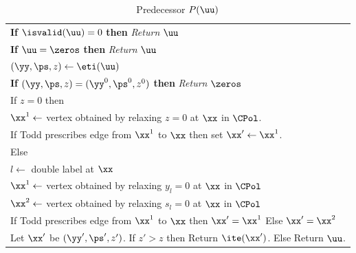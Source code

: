 \begin{table}[!htb]
\caption{Predecessor $P(\uu)$}\label{tab:P}
\begin{tabular}{|l|}
\hline
\hspace{5pt} {\bf If} $\isvalid(\uu)=0$ {\bf then} {\em Return} $\uu$\\
\hspace{5pt} {\bf If} $\uu=\zeros$ {\bf then} {\em Return} $\uu$\\
\hspace{5pt} $(\yy,\ps,z) \leftarrow \eti(\uu)$\\
\hspace{5pt} {\bf If} $(\yy,\ps,z)=(\yy^0,\ps^0,z^0)$ {\bf then} {\em Return} $\zeros$\\
\hspace{5pt} If $z=0$ then \\
\hspace{10pt} $\xx^1\leftarrow$ vertex obtained by relaxing $z=0$ at $\xx$ in $\CPol$. \\
\hspace{10pt} If Todd \cite{todd1976orientation} prescribes edge from $\xx^1$ to $\xx$ then set $\xx'\leftarrow \xx^1$.\\
\hspace{5pt} Else\\
\hspace{10pt} $l\leftarrow $ double label at $\xx$\\
\hspace{10pt} $\xx^1\leftarrow $ vertex obtained by relaxing $y_l=0$ at $\xx$ in $\CPol$ \\
\hspace{10pt} $\xx^2\leftarrow $ vertex obtained by relaxing $s_l=0$ at $\xx$ in $\CPol$ \\
\hspace{10pt} If Todd \cite{todd1976orientation} prescribes edge from $\xx^1$ to $\xx$ then $\xx'=\xx^1$ Else $\xx'=\xx^2$\\
\hspace{10pt} Let $\xx'$ be $(\yy',\ps',z')$. If $z'>z$ then Return $\ite(\xx')$. Else Return $\uu$.\\
\hline
\end{tabular}
\end{table}



